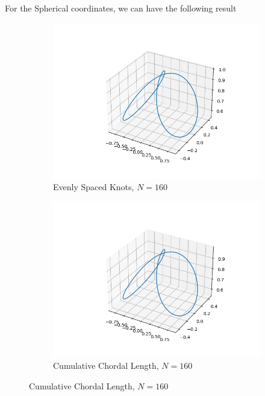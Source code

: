 \documentclass[a4paper]{article}
\begin{document}
For the Spherical coordinates, we can have the following result
\begin{figure}[H]
    \centering
    \begin{subfigure}[b]{0.45\textwidth}
        \centering
        \includegraphics[width=\textwidth]{../figure/E_3_PPBall160.png}
        \caption{Evenly Spaced Knots, $N=160$}
    \end{subfigure}
    \begin{subfigure}[b]{0.45\textwidth}
        \centering
        \includegraphics[width=\textwidth]{../figure/E_3_PPBall_cum160.png}
        \caption{Cumulative Chordal Length, $N=160$}
    \end{subfigure}
\end{figure}
\end{document}
